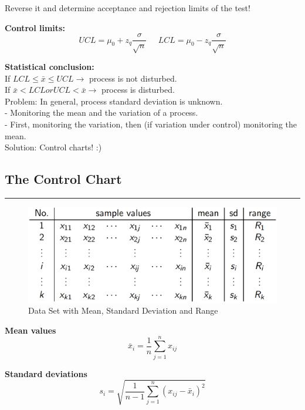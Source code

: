 Reverse it and determine acceptance and rejection limits of the test!

\textbf{Control limits:}
\begin{equation}
  UCL = \mu_0 + z_q \frac{\sigma}{\sqrt{n}} \;\;\;\;\; LCL = \mu_0 - z_q \frac{\sigma}{\sqrt{n}}
\end{equation}

\textbf{Statistical conclusion:}\\
If $LCL \leq \bar{x} \leq UCL \rightarrow$ process is not disturbed.\\
If $\bar{x} < LCL or UCL < \bar{x} \rightarrow$ process is disturbed.\\

Problem: In general, process standard deviation is unknown.\\
 - Monitoring the mean and the variation of a process.\\
 - First, monitoring the variation, then (if variation under control) monitoring the mean.\\

Solution: Control charts! :)




\subsection{The Control Chart}
\noindent\rule[\linienAbstand]{\linewidth}{\linienDicke}
\begin{figure}[H]
  \centering
  \includegraphics[width = 0.8\linewidth]{Pics/2.1.png}
  \caption{Data Set with Mean, Standard Deviation and Range}
  \label{2.1}
\end{figure}

\textbf{Mean values}
\begin{equation}
  \bar{x}_i = \frac{1}{n} \sum_{j=1}^n x_{ij}
\end{equation}

\textbf{Standard deviations}
\begin{equation}
  s_i = \sqrt{\frac{1}{n-1} \sum_{j=1}^n \left(x_{ij} - \bar{x}_i\right)^2}
\end{equation}

